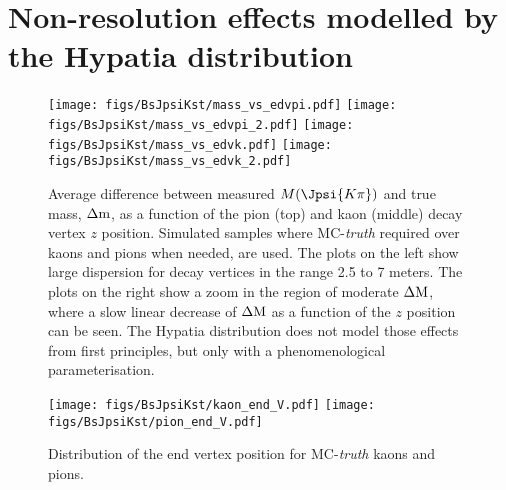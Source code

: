 \section{Non-resolution effects modelled by the Hypatia distribution}\label{app:BsJpsiKst_massfit_mvt}
\begin{figure}[h]
\begin{center}
\texttt{[image: figs/BsJpsiKst/mass\_vs\_edvpi.pdf]}
\texttt{[image: figs/BsJpsiKst/mass\_vs\_edvpi\_2.pdf]}
\texttt{[image: figs/BsJpsiKst/mass\_vs\_edvk.pdf]}
\texttt{[image: figs/BsJpsiKst/mass\_vs\_edvk\_2.pdf]}
\caption{Average difference between measured $M(\Jpsi{K\pi})$ and true mass, $\Delta{\rm m}$, as a function of the pion (top) and kaon (middle) decay vertex $z$ position. Simulated samples where MC-{\it truth} required over kaons and pions when needed, are used. The plots on the left show large dispersion for decay vertices in the range 2.5 to 7 meters. The plots on the right show a zoom in the region of moderate $\Delta{\rm M}$, where a slow linear decrease of $\Delta{\rm M}$ as a function of the $z$ position can be seen. The Hypatia distribution does not model those effects from first principles, but only with a phenomenological parameterisation.}
\label{fig:mass_vs_time_flight}
\end{center}
\end{figure}
%
\begin{figure}[h]
\begin{center}
\texttt{[image: figs/BsJpsiKst/kaon\_end\_V.pdf]}
\texttt{[image: figs/BsJpsiKst/pion\_end\_V.pdf]}
\caption{Distribution of the end vertex position for MC-{\it truth} kaons and pions.}
\label{fig:mass_vs_time_flight_endvPos}
\end{center}
\end{figure}
%
\newpage

